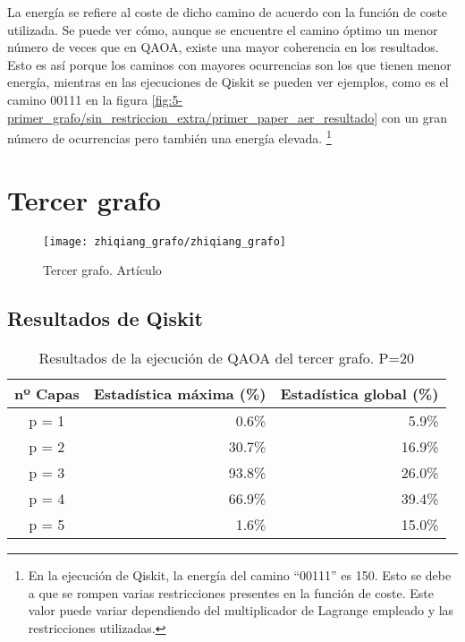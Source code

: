 \documentclass{article}
\begin{document}
La energía se refiere al coste de dicho camino de acuerdo con la función de coste utilizada. Se puede ver cómo, aunque se encuentre el camino óptimo un menor número de veces que en QAOA, existe una mayor coherencia en los resultados. Esto es así porque los caminos con mayores ocurrencias son los que tienen menor energía, mientras en las ejecuciones de Qiskit se pueden ver ejemplos, como es el camino 00111 en la figura \ref{fig:5-primer_grafo/sin_restriccion_extra/primer_paper_aer_resultado} con un gran número de ocurrencias pero también una energía elevada.
\footnote{En la ejecución de Qiskit, la energía del camino ``00111'' es 150. Esto se debe a que se rompen varias restricciones presentes en la función de coste. Este valor puede variar dependiendo del multiplicador de Lagrange empleado
  y las restricciones utilizadas.}

\section{Tercer grafo}

\begin{figure}[htbp]
  \centering
  \texttt{[image: zhiqiang\_grafo/zhiqiang\_grafo]}
  \caption{Tercer grafo. Artículo \cite{solving_shortest_path_with_qaoa}}
\end{figure}

\subsection{Resultados de Qiskit}
\begin{table}[htbp]
  \centering
  \begin{tabular}{|c|r|r|}
    \hline
    \textbf{nº Capas} & \textbf{Estadística máxima (\%)} & \textbf{Estadística global (\%)} \\ \hline
    p = 1 &  0.6\% &  5.9\% \\ \hline
    p = 2 & 30.7\% & 16.9\% \\ \hline
    p = 3 & 93.8\% & 26.0\% \\ \hline
    p = 4 & 66.9\% & 39.4\% \\ \hline  %
    p = 5 &  1.6\% & 15.0\% \\ \hline  %
  \end{tabular}
  \caption{Resultados de la ejecución de QAOA del tercer grafo. P=20}
\end{table}
\end{document}
